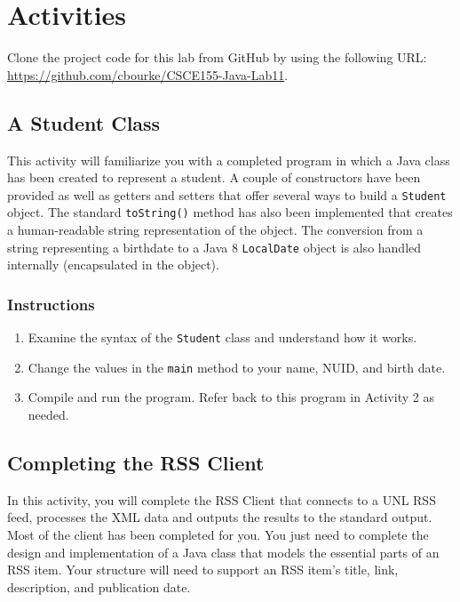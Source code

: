 \documentclass[12pt]{scrartcl}
\begin{document}
\section{Activities}

Clone the project code for this lab from GitHub by using the following 
URL:\\ \url{https://github.com/cbourke/CSCE155-Java-Lab11}.

\subsection{A Student Class}

This activity will familiarize you with a completed program in which 
a Java class has been created to represent a student.  A couple of 
constructors have been provided as well as getters and setters that 
offer several ways to build a \texttt{Student} object.  The 
standard \texttt{toString()} method has also been implemented 
that creates a human-readable string representation of the object.  
The conversion from a string representing a birthdate to a Java 8 
\texttt{LocalDate} object is also handled internally (encapsulated 
in the object).


\subsubsection*{Instructions}

\begin{enumerate}
  \item Examine the syntax of the \texttt{Student} class and 
  	understand how it works.
  \item Change the values in the \texttt{main} method to your 
	name, NUID, and birth date.
  \item Compile and run the program.  Refer back to this program in 
	Activity 2 as needed.
\end{enumerate}
	
\subsection{Completing the RSS Client}

In this activity, you will complete the RSS Client that connects to a 
UNL RSS feed, processes the XML data and outputs the results 
to the standard output.  Most of the client has been completed for 
you.  You just need to complete the design and implementation of 
a Java class that models the essential parts of an RSS item.  Your 
structure will need to support an RSS item's title, link, description, 
and publication date.  
\end{document}
